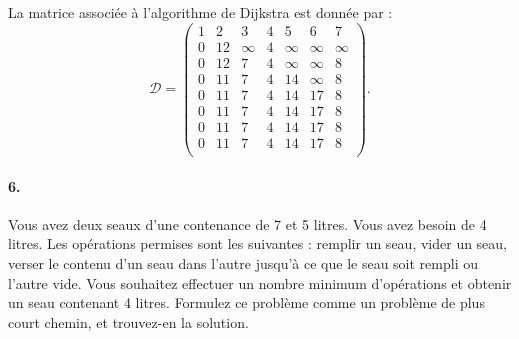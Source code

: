 \begin{solution}
  La matrice associée à l'algorithme de Dijkstra est donnée par :
  \[
    \mathcal{D}=
    \begin{pmatrix}
      1 & 2   & 3       & 4  & 5          & 6 & 7 \\
      \boxed{0} & 12 & \infty & 4 & \infty    &\infty & \infty  \\
      \boxed{0} & 12 & 7       & \boxed{4} & \infty    & \infty  & 8  \\
      \boxed{0} & 11 & \boxed{7}       &\boxed{4} & 14         & \infty  & 8\\
      \boxed{0} & 11 & \boxed{7}       & \boxed{4}& 14         & 17 & \boxed{8}\\
      \boxed{0} & \boxed{11} & \boxed{7}       & \boxed{4} & 14         & 17 &  \boxed{8}\\
      \boxed{0} & \boxed{11} & \boxed{7}      & \boxed{4} & \boxed{14}         & 17 &  \boxed{8}\\
      \boxed{0} & \boxed{11}& \boxed{7}       & \boxed{4} & \boxed{14}         & \boxed{17} &  \boxed{8}\\
    \end{pmatrix}.
  \]
\end{solution}

\paragraph{6. } Vous avez deux seaux d'une contenance de 7 et 5 litres. Vous avez besoin de 4 litres. Les opérations permises sont les suivantes : remplir un seau, vider un seau, verser le contenu d'un seau dans l'autre jusqu'à ce que le seau soit rempli ou l'autre vide. Vous souhaitez effectuer un nombre minimum d'opérations et obtenir un seau contenant 4 litres. Formulez ce problème comme un problème de plus court chemin, et trouvez-en la solution.

